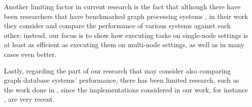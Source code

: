 \documentclass[a4paper,11pt]{article}
\begin{document}
\par Another limiting factor in current research is the fact that although there have been researchers that have benchmarked graph processing systems \cite{benchmarking-vision, how-well, graphalytics, scalability-cost}, in their work they consider and compare the performance of various systems against each other; instead, our focus is to show how executing tasks on single-node settings is at least as efficient as executing them on multi-node settings, as well as in many cases even better.

\par Lastly, regarding the part of our research that may consider also comparing graph database systems' performance, there has been limited research, such as the work done in \cite{traversal-benchmarking}, since the implementations considered in our work, for instance \cite{emptyheaded}, are very recent.






\end{document}

